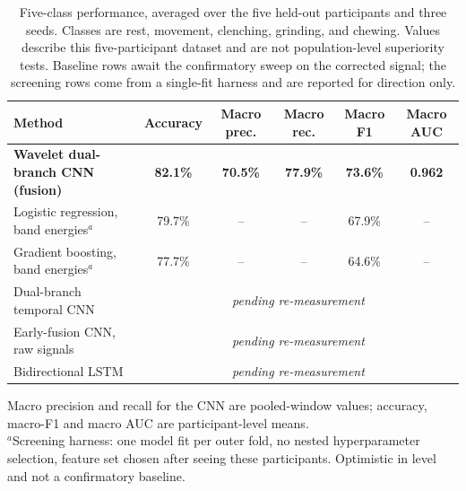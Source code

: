 \documentclass[pdflatex,sn-nature,iicol]{sn-jnl}
\begin{document}
\begin{table}[t]
  \centering
  \caption{Five-class performance, averaged over the five held-out participants and three seeds. Classes are rest, movement, clenching, grinding, and chewing. Values describe this five-participant dataset and are not population-level superiority tests. Baseline rows await the confirmatory sweep on the corrected signal; the screening rows come from a single-fit harness and are reported for direction only.}
  \label{tab:results}
  \small
  \begin{tabular}{lccccc}
    \toprule
    Method & Accuracy & Macro prec. & Macro rec. & Macro F1 & Macro AUC \\
    \midrule
    \textbf{Wavelet dual-branch CNN (fusion)} & \textbf{82.1\%} & \textbf{70.5\%} & \textbf{77.9\%} & \textbf{73.6\%} & \textbf{0.962} \\
    \midrule
    Logistic regression, band energies$^{a}$ & 79.7\% & -- & -- & 67.9\% & -- \\
    Gradient boosting, band energies$^{a}$ & 77.7\% & -- & -- & 64.6\% & -- \\
    \midrule
    Dual-branch temporal CNN & \multicolumn{5}{c}{\emph{pending re-measurement}} \\
    Early-fusion CNN, raw signals & \multicolumn{5}{c}{\emph{pending re-measurement}} \\
    Bidirectional LSTM & \multicolumn{5}{c}{\emph{pending re-measurement}} \\
    \bottomrule
  \end{tabular}
  \begin{flushleft}\footnotesize
  Macro precision and recall for the CNN are pooled-window values; accuracy, macro-F1 and macro AUC are participant-level means.\\
  $^{a}$Screening harness: one model fit per outer fold, no nested hyperparameter selection, feature set chosen after seeing these participants. Optimistic in level and not a confirmatory baseline.
  \end{flushleft}
\end{table}
\end{document}
